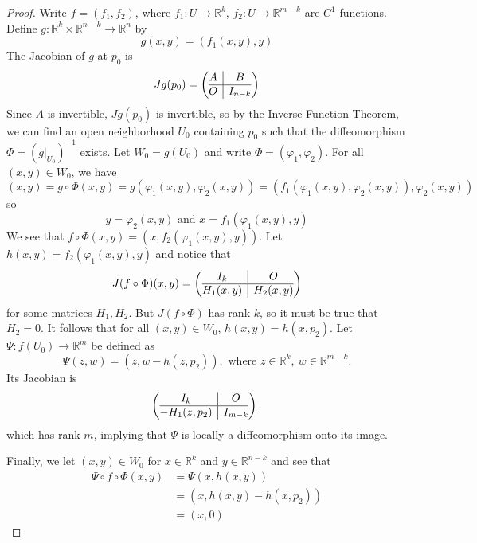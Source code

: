 \documentclass{article}
\theoremstyle{plain} %
\numberwithin{thm}{section} %
\theoremstyle{definition}
\begin{document}
\begin{proof}
        Write \(f = (f_1, f_2)\), where \(f_1: U \to \mathbb{R}^k\), \(f_2: U \to \mathbb{R}^{m-k}\) are \(C^1\) functions. Define \(g: \mathbb{R}^k \times \mathbb{R}^{n-k} \to \mathbb{R}^n\) by
        \[
            g(x,y) = (f_1(x,y), y)
        \]
        The Jacobian of \(g\) at \(p_0\) is
        \[
            Jg(p_0) = \left( \begin{array}{@{}c|c@{}}
                A & B \\
                \hline
                O & I_{n-k} \\
            \end{array} \right) 
        \]
        Since \(A\) is invertible, \(Jg(p_0)\) is invertible, so by the Inverse Function Theorem, we can find an open neighborhood \(U_0\) containing \(p_0\) such that the diffeomorphism \(\Phi = (g | _{U_0})^{-1}\) exists. Let \(W_0 = g(U_0)\) and write \(\Phi = (\varphi _1, \varphi _2)\). For all \((x,y) \in W_0\), we have
        \[
            (x,y) = g \circ \Phi (x,y) = g(\varphi _1(x,y), \varphi _2(x,y)) = (f_1(\varphi _1(x,y), \varphi _2(x,y)), \varphi _2(x,y))
        \]
        so
        \[
            y = \varphi _2(x,y) \text{ and } x = f_1(\varphi _1(x,y), y)
        \]
        We see that \(f \circ \Phi (x,y) = (x, f_2(\varphi _1(x,y), y))\). Let \(h(x,y) = f_2(\varphi _1(x,y), y)\) and notice that
        \[
            J (f \circ \Phi)(x,y) = \left( \begin{array}{@{}c|c@{}}
                I_k & O \\
                \hline
                H_1(x,y) & H_2(x,y)
            \end{array} \right) 
        \]
        for some matrices \(H_1, H_2\). But \(J (f \circ \Phi)\) has rank \(k\), so it must be true that \(H_2 = 0\). It follows that for all \((x,y) \in W_0\), \(h(x, y) = h(x, p_2)\).
        Let \(\Psi : f(U_0) \to \mathbb{R}^m\) be defined as
        \[
            \Psi (z,w) = (z, w - h(z, p_2)), \text{ where } z \in \mathbb{R}^k,\ w \in \mathbb{R}^{m-k}.
        \]
        Its Jacobian is
        \[
            \left( \begin{array}{@{}c|c@{}}
                I_k & O \\
                \hline
                -H_1(z,p_2) & I_{m-k} \\
            \end{array} \right).
        \]
        which has rank \(m\), implying that \(\Psi\) is locally a diffeomorphism onto its image.

        Finally, we let \((x,y) \in W_0\) for \(x \in \mathbb{R}^k\) and \(y \in \mathbb{R}^{n-k}\) and see that
        \begin{align*}
            \Psi \circ f \circ \Phi (x, y) &= \Psi (x, h(x,y)) \\
            &= (x, h(x,y) - h(x, p_2)) \\
            &= (x, 0)
        \end{align*}
    \end{proof}
\end{document}
